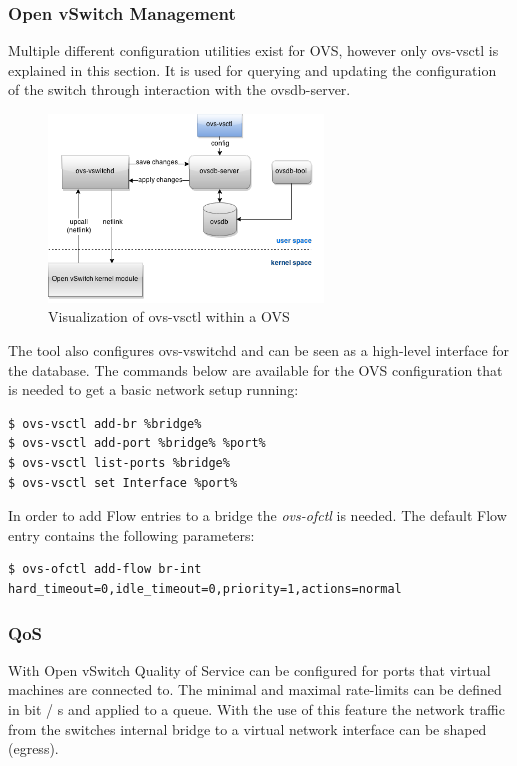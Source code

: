 \subsubsection{Open vSwitch Management}

Multiple different configuration utilities exist for OVS, however only ovs-vsctl is explained in this section. It is used for querying and updating the configuration of the switch through interaction with the ovsdb-server.

\begin{figure}[H]
\centering
\includegraphics[width=0.65\textwidth]{images/fundamentals/openvswitch_vsctl.png}
\caption{Visualization of ovs-vsctl within a OVS}
\end{figure}

The tool also configures ovs-vswitchd and can be seen as a high-level interface for the database.
The commands below are available for the OVS configuration that is needed to get a basic network setup running:

\begin{lstlisting}[language=commands]
$ ovs-vsctl add-br %bridge%
$ ovs-vsctl add-port %bridge% %port%
$ ovs-vsctl list-ports %bridge%
$ ovs-vsctl set Interface %port%
\end{lstlisting}

In order to add Flow entries to a bridge the \textit{ovs-ofctl} is needed. The default Flow entry contains the following parameters:

\begin{lstlisting}[language=commands]
$ ovs-ofctl add-flow br-int hard_timeout=0,idle_timeout=0,priority=1,actions=normal
\end{lstlisting}


\subsubsection{QoS}

With Open vSwitch Quality of Service can be configured for ports that virtual machines are connected to. The minimal and maximal rate-limits can be defined in bit / s and applied to a queue. With the use of this feature the network traffic from the switches internal bridge to a virtual network interface can be shaped (egress).

